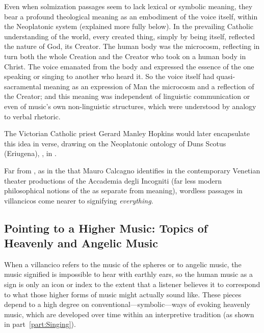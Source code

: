 Even when solmization passages seem to lack lexical or symbolic meaning, they
bear a profound theological meaning as an embodiment of the voice itself,
within the Neoplatonic system (explained more fully below).
In the prevailing Catholic understanding of the world, every created thing,
simply by being itself, reflected the nature of God, its Creator.
The human body was the microcosm, reflecting in turn both the whole Creation
and the Creator who took on a human body in Christ.
The voice emanated from the body and expressed the essence of the one speaking
or singing to another who heard it.
So the voice itself had quasi-sacramental meaning as an expression of Man the
microcosm and a reflection of the Creator; and this meaning was independent of
linguistic communication or even of music's own non-linguistic structures,
which were understood by analogy to verbal rhetoric.%
\begin{Footnote} 
    The Victorian Catholic priest Gerard Manley Hopkins would later encapsulate
    this idea in verse, drawing on the Neoplatonic ontology of Duns Scotus
    (Eriugena), 
    , in \autocite[95]{Hopkins:Poems}.
\end{Footnote}
Far from , as in the  that Mauro Calcagno identifies in the contemporary Venetian theater
productions of the Accademia degli Incogniti (far less modern philosophical
notions of the  as separate from meaning), wordless
passages in villancicos come nearer to signifying \emph{everything}.%


\subsection{Pointing to a Higher Music: Topics of Heavenly and Angelic Music}

When a villancico refers to the music of the spheres or to angelic music, the music signified is impossible to hear with earthly ears, so the human music as a sign is only an icon or index to the extent that a listener believes it to correspond to what those higher forms of music might actually sound like.
These pieces depend to a high degree on conventional---symbolic---ways of evoking heavenly music, which are developed over time within an interpretive tradition (as shown in part~\ref{part:Singing}).

